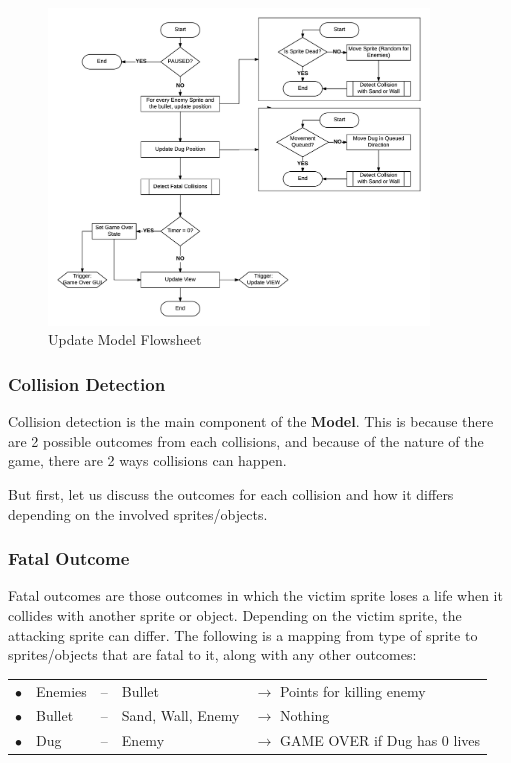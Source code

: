    \begin{figure}[H]
      \centering
      \includegraphics[width=0.9\textwidth]{images/update-model.png}
      \caption{\label{fig:update-model} Update Model Flowsheet}

    \end{figure}

    \subsubsection{Collision Detection}

    Collision detection is the main component of the \textbf{Model}. This is because there are 2 possible outcomes from each collisions, and because of the nature of the game, there are 2 ways collisions can happen.

    But first, let us discuss the outcomes for each collision and how it differs depending on the involved sprites/objects.

    \subsubsection*{Fatal Outcome}

    Fatal outcomes are those outcomes in which the victim sprite loses a life when it collides with another sprite or object. Depending on the victim sprite, the attacking sprite can differ.
    The following is a mapping from type of sprite to sprites/objects that are fatal to it, along with any other outcomes:

    \begin{tabular}{clcll}
      $\bullet$ & Enemies	& -- &  Bullet		&   $\rightarrow$ Points for killing enemy \\
      $\bullet$ & Bullet	& -- &  Sand, Wall, Enemy	&   $\rightarrow$ Nothing \\
      $\bullet$ & Dug		& -- &  Enemy		&   $\rightarrow$ GAME OVER if Dug has 0 lives
    \end{tabular}

